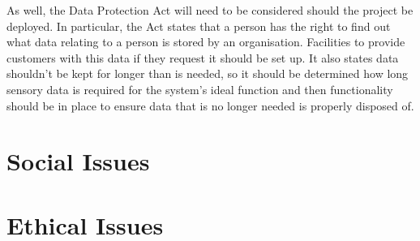\documentclass[]{report}
\begin{document}
As well, the Data Protection Act\cite{dataprotectionact2018} will need to be considered should the project be deployed. In particular, the Act states that a person has the right to find out what data relating to a person is stored by an organisation. Facilities to provide customers with this data if they request it should be set up. It also states data shouldn't be kept for longer than is needed, so it should be determined how long sensory data is required for the system's ideal function and then functionality should be in place to ensure data that is no longer needed is properly disposed of. 

\section{Social Issues}


\section{Ethical Issues}

	
	
	\newpage
	\begin{appendices}
		
		
		
	\end{appendices}
\end{document}

